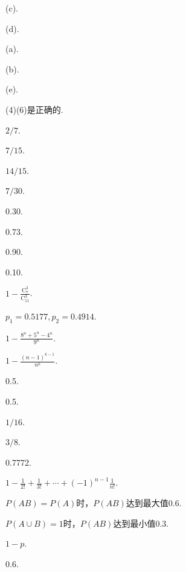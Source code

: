 \begin{answer}
  \item \begin{enumerate*}
    \item (c).
    \item (d).
    \item (a).
    \item (b).
    \item (e).
  \end{enumerate*}

  \item (4)(6)是正确的.

  \item $2/7$.

  \item \begin{enumerate*}
    \item $7/15$.
    \item $14/15$.
    \item $7/30$.
  \end{enumerate*}

  \item \begin{enumerate*}
    \item 0.30.
    \item 0.73.
    \item 0.90.
    \item 0.10.
  \end{enumerate*}

  \item $1-\frac{\mathrm C_7^3}{\mathrm C_{11}^3}$.

  \item $p_1=0.5177,p_2=0.4914$.

  \item $1-\frac{8^n+5^n-4^n}{9^n}$.

  \item $1-\frac{(n-1)^{k-1}}{n^k}$.

  \item 0.5.
  \item 0.5.
  \item \begin{enumerate*}
    \item $1/16$.
    \item $3/8$.
  \end{enumerate*}

  \item 0.7772.
  \item $1-\frac1{2!}+\frac1{3!}+\cdots+(-1)^{n-1}\frac1{n!}$.
  \item \begin{enumerate*}
    \item $P(AB)=P(A)$时，$P(AB)$达到最大值0.6.
    \item $P(A\cup B)=1$时，$P(AB)$达到最小值0.3.
  \end{enumerate*}

  \item $1-p$.
  \item 0.6.
\end{answer}

